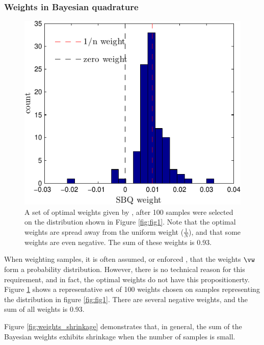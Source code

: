 	\subsubsection{Weights in Bayesian quadrature}

\begin{figure}
	\centering
	\includegraphics[width=\columnwidth]{figs/herding/weights_v1_n100}
	\caption[Empirical distribution of weights in sequential Bayesian quadrature]{A set of optimal weights given by \bq{}, after 100 \sbq{} samples were selected on the distribution shown in Figure \ref{fig:fig1}.  Note that the optimal weights are spread away from the uniform weight ($\frac{1}{N}$), and that some weights are even negative.  The sum of these weights is 0.93.}
	\label{fig:weights100}
\end{figure}

When weighting samples, it is often assumed, or enforced \citep[as in][]{bach2012equivalence,Song2008}, that the weights $\vw$ form a probability distribution.  However, there is no technical reason for this requirement, and in fact, the optimal weights do not have this propositionerty.  Figure \ref{fig:weights100} shows a representative set of 100 \bq{} weights chosen on samples representing the distribution in figure \ref{fig:fig1}.  There are several negative weights, and the sum of all weights is 0.93.

Figure \ref{fig:weights_shrinkage} demonstrates that, in general, the sum of the Bayesian weights exhibits shrinkage when the number of samples is small.

